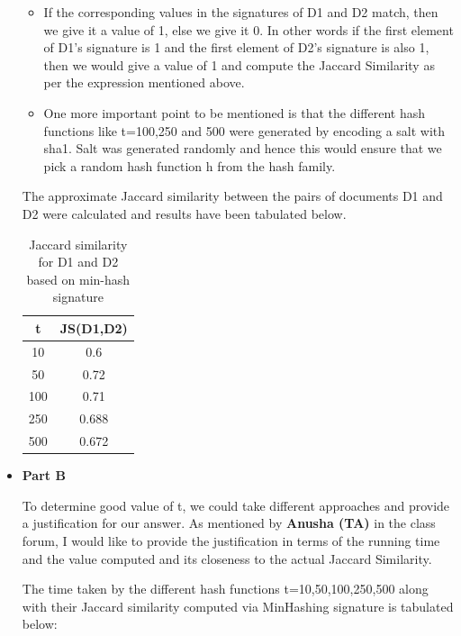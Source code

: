 \documentclass[11pt]{article}
\begin{document}
\begin{itemize}
\begin{itemize}
\item If the corresponding values in the signatures of D1 and D2 match, then we give it a value of 1, else we give it 0. In other words if the first element of D1's signature is 1 and the first element of D2's signature is also 1, then we would give a value of 1 and compute the Jaccard Similarity as per the expression mentioned above.

\item One more important point to be mentioned is that the different hash functions like t=100,250 and 500 were generated by encoding  a salt with sha1. Salt was generated randomly and hence this would ensure that we pick a random hash function h from the hash family. 

\end{itemize}
The approximate Jaccard similarity between the pairs of documents D1 and D2 were calculated and results have been tabulated below. 


	\begin{table}[h]
		\centering
		\begin{tabular}{|c|c|}
			\hline
			\textbf{t} & \textbf{JS(D1,D2)}   \\
			\hline
			10 &  0.6 \\
			\hline
			50 &    0.72    \\
			\hline
			100 &   0.71    \\
			\hline
			250 &    0.688   \\
			\hline
			500 &  0.672     \\
			\hline
		\end{tabular}
		\caption{Jaccard similarity for D1 and D2 based on min-hash signature }
		\label{t2}
	\end{table}
	
	
 
\item[] \textbf{Part B}
 
 To determine good value of t, we could take different approaches and provide a justification for our answer. As mentioned by \textbf{ Anusha (TA) } in the class forum, I would like to provide the justification in terms of the running time and the value computed and its closeness to the actual Jaccard Similarity.
 
 The time taken by the different hash functions {t=10,50,100,250,500} along with their Jaccard similarity computed via MinHashing signature is tabulated below:
 

\end{itemize}
\end{document}
